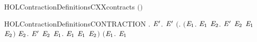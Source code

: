 \newcommand{\HOLContractionDate}{12 Dicembre 2019}
\newcommand{\HOLContractionTime}{11:58}
\begin{SaveVerbatim}{HOLContractionDefinitionsCXXcontracts}
\HOLTokenTurnstile{}  \HOLSymConst{\ensuremath{=}}  \ensuremath{(}\ensuremath{)}
\end{SaveVerbatim}
\newcommand{\HOLContractionDefinitionsCXXcontracts}{\UseVerbatim{HOLContractionDefinitionsCXXcontracts}}
\begin{SaveVerbatim}{HOLContractionDefinitionsCONTRACTION}
\HOLTokenTurnstile{} \HOLSymConst{\HOLTokenForall{}}.
         \HOLSymConst{\HOLTokenEquiv{}}
       \HOLSymConst{\HOLTokenForall{}} \ensuremath{\HOLBoundVar{E}\sp{\prime}}.
             \ensuremath{\HOLBoundVar{E}\sp{\prime}} \HOLSymConst{\HOLTokenImp{}}
           \ensuremath{(}\HOLSymConst{\HOLTokenForall{}}.
                \ensuremath{(}\HOLSymConst{\HOLTokenForall{}}\ensuremath{\HOLBoundVar{E}\sb{\mathrm{1}}}.
                      \HOLTokenTransBegin{} \HOLTokenTransEnd \ensuremath{\HOLBoundVar{E}\sb{\mathrm{1}}} \HOLSymConst{\HOLTokenImp{}}
                     \HOLSymConst{\HOLTokenExists{}}\ensuremath{\HOLBoundVar{E}\sb{\mathrm{2}}}. \ensuremath{\HOLBoundVar{E}\sp{\prime}} \HOLTokenTransBegin{} \HOLTokenTransEnd \ensuremath{\HOLBoundVar{E}\sb{\mathrm{2}}} \HOLSymConst{\HOLTokenConj{}}  \ensuremath{\HOLBoundVar{E}\sb{\mathrm{1}}} \ensuremath{\HOLBoundVar{E}\sb{\mathrm{2}}}\ensuremath{)} \HOLSymConst{\HOLTokenConj{}}
                \HOLSymConst{\HOLTokenForall{}}\ensuremath{\HOLBoundVar{E}\sb{\mathrm{2}}}.
                    \ensuremath{\HOLBoundVar{E}\sp{\prime}} \HOLTokenTransBegin{} \HOLTokenTransEnd \ensuremath{\HOLBoundVar{E}\sb{\mathrm{2}}} \HOLSymConst{\HOLTokenImp{}}
                    \HOLSymConst{\HOLTokenExists{}}\ensuremath{\HOLBoundVar{E}\sb{\mathrm{1}}}.  \HOLTokenWeakTransBegin{} \HOLTokenWeakTransEnd \ensuremath{\HOLBoundVar{E}\sb{\mathrm{1}}} \HOLSymConst{\HOLTokenConj{}}  \ensuremath{\HOLBoundVar{E}\sb{\mathrm{1}}} \ensuremath{\HOLBoundVar{E}\sb{\mathrm{2}}}\ensuremath{)} \HOLSymConst{\HOLTokenConj{}}
           \ensuremath{(}\HOLSymConst{\HOLTokenForall{}}\ensuremath{\HOLBoundVar{E}\sb{\mathrm{1}}}.
                 \HOLTokenTransBegin\HOLConst{\ensuremath{\tau}}\HOLTokenTransEnd \ensuremath{\HOLBoundVar{E}\sb{\mathrm{1}}} \HOLSymConst{\HOLTokenImp{}}

\end{SaveVerbatim}
